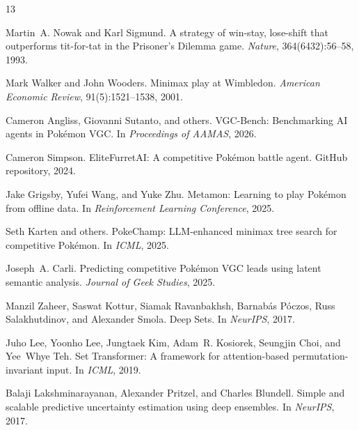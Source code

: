 \documentclass{article}
\begin{document}

\begin{thebibliography}{13}

Martin~A. Nowak and Karl Sigmund.
\newblock A strategy of win-stay, lose-shift that outperforms tit-for-tat in the Prisoner's Dilemma game.
\newblock \emph{Nature}, 364(6432):56--58, 1993.

Mark Walker and John Wooders.
\newblock Minimax play at Wimbledon.
\newblock \emph{American Economic Review}, 91(5):1521--1538, 2001.

Cameron Angliss, Giovanni Sutanto, and others.
\newblock VGC-Bench: Benchmarking AI agents in Pok\'emon VGC.
\newblock In \emph{Proceedings of AAMAS}, 2026.

Cameron Simpson.
\newblock EliteFurretAI: A competitive Pok\'emon battle agent.
\newblock GitHub repository, 2024.

Jake Grigsby, Yufei Wang, and Yuke Zhu.
\newblock Metamon: Learning to play Pok\'emon from offline data.
\newblock In \emph{Reinforcement Learning Conference}, 2025.

Seth Karten and others.
\newblock PokeChamp: LLM-enhanced minimax tree search for competitive Pok\'emon.
\newblock In \emph{ICML}, 2025.

Joseph~A. Carli.
\newblock Predicting competitive Pok\'emon VGC leads using latent semantic analysis.
\newblock \emph{Journal of Geek Studies}, 2025.

Manzil Zaheer, Saswat Kottur, Siamak Ravanbakhsh, Barnab{\'a}s P{\'o}czos, Russ Salakhutdinov, and Alexander Smola.
\newblock Deep Sets.
\newblock In \emph{NeurIPS}, 2017.

Juho Lee, Yoonho Lee, Jungtaek Kim, Adam~R. Kosiorek, Seungjin Choi, and Yee~Whye Teh.
\newblock Set Transformer: A framework for attention-based permutation-invariant input.
\newblock In \emph{ICML}, 2019.

Balaji Lakshminarayanan, Alexander Pritzel, and Charles Blundell.
\newblock Simple and scalable predictive uncertainty estimation using deep ensembles.
\newblock In \emph{NeurIPS}, 2017.

\end{thebibliography}
\end{document}
